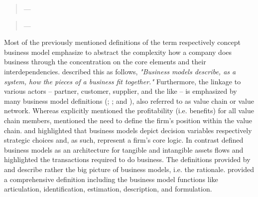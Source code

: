 \begin{quotation}\vspace*{-5pt}{\slshape 
A business model \ldots consists of four interlocking elements [customer value proposition, profit formula, key resources, and key processes] that, taken together, create and deliver value.}
\vspace*{-7pt}
\begin{flushright}
	--- \citealp[p. 52]{Johnson2008}
\end{flushright}
\end{quotation}

\begin{quotation}\vspace*{-5pt}{\slshape 
A business model describes the rationale of how an organization creates, delivers and captures value.}
\vspace*{-7pt}
\begin{flushright}
	--- \citealp[p. 14]{Osterwalder2010}
\end{flushright}
\end{quotation}

Most of the previously mentioned definitions of the term respectively concept business model emphasize to abstract the complexity how a company does business through the concentration on the core elements and their interdependencies. \citet[p. 91]{Magretta2002} described this as follows, \textit{"Business models describe, as a system, how the pieces of a business fit together."} Furthermore, the linkage to various actors -- partner, customer, supplier, and the like -- is emphasized by many business model definitions (\citealp[p. 2]{Timmers1998}; \citealp[pp. 533-534]{Chesbrough2002}; and \citealp[p. 202]{Shafer2005}), also referred to as value chain or value network. Whereas \citet[p. 2]{Timmers1998} explicitly mentioned the profitability (i.e. benefits) for all value chain members, \citet[pp. 533-534]{Chesbrough2002} mentioned the need to define the firm's position within the value chain. \citet[p. 727]{Morris2005} and \citet[p. 202]{Shafer2005} highlighted that business models depict decision variables respectively strategic choices and, as such, represent a firm's core logic. In contrast \citet[p. 2]{Timmers1998} defined business models as an architecture for tangible and intangible assets flows and \citet[p. 511]{Amit2001} highlighted the transactions required to do business. The definitions provided by \citet[p. 52]{Johnson2008} and \citet[p. 14]{Osterwalder2010} describe rather the big picture of business models, i.e. the rationale. \citet[p. 533-534]{Chesbrough2002} provided a comprehensive definition including the business model functions like articulation, identification, estimation, description, and formulation.

